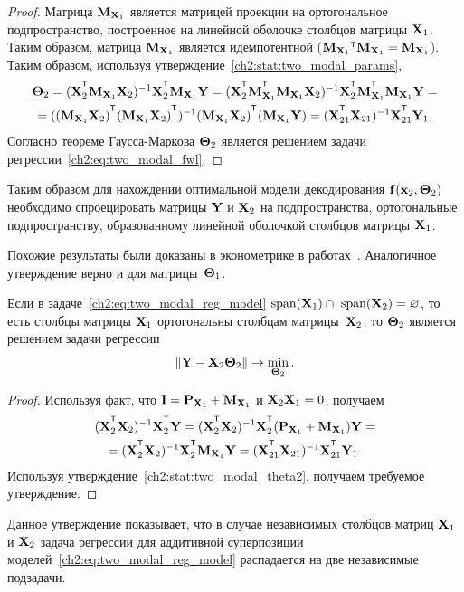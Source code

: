 \begin{proof}
	Матрица $\mathbf{M}_{\mathbf{X}_1}$ является матрицей проекции на ортогональное подпространство, построенное на линейной оболочке столбцов матрицы $\mathbf{X}_1$. Таким образом, матрица $\mathbf{M}_{\mathbf{X}_1}$ является идемпотентной ($\bM_{\bX_1}{\T} \bM_{\bX_1} = \bM_{\bX_1}$). 
	Таким образом, используя утверждение~\ref{ch2:stat:two_modal_params},
	\begin{multline*}
		\bTheta_2 = (\bX_2^{\T} \bM_{\bX_1} \bX_2)^{-1} \bX_2^{\T} \bM_{\bX_1} \bY = (\bX_2^{\T} \bM_{\bX_1}^{\T} \bM_{\bX_1} \bX_2)^{-1} \bX_2^{\T} \bM_{\bX_1}^{\T} \bM_{\bX_1} \bY = \\
		= ((\bM_{\bX_1} \bX_2)^{\T} (\bM_{\bX_1} \bX_2)^{\T})^{-1} (\bM_{\bX_1} \bX_2)^{\T} (\bM_{\bX_1} \bY) = (\bX_{21}^{\T} \bX_{21})^{-1} \bX_{21}^{\T} \bY_1.
	\end{multline*}
	Согласно теореме Гаусса-Маркова $\boldsymbol{\Theta}_2$ является решением задачи регрессии~\eqref{ch2:eq:two_modal_fwl}.
\end{proof}

Таким образом для нахождении оптимальной модели декодирования $\mathbf{f}(\mathbf{x}_2, \boldsymbol{\Theta}_2)$ необходимо спроецировать матрицы $\mathbf{Y}$ и $\mathbf{X}_2$ на подпространства, ортогональные подпространству, образованному линейной оболочкой столбцов матрицы $\mathbf{X}_1$.

Похожие результаты были доказаны в эконометрике в работах~\cite{frisch1933partial,lovell1963seasonal,cinelli2020making}. Аналогичное утверждение верно и для матрицы~$\boldsymbol{\Theta}_1$. 

\begin{statement}
	Если в задаче~\eqref{ch2:eq:two_modal_reg_model} $\text{span}(\mathbf{X}_1) \cap \text{ span}(\mathbf{X}_2) = \varnothing$, то есть столбцы матрицы $\mathbf{X}_1$ ортогональны столбцам матрицы~$\mathbf{X}_2$, то $\boldsymbol{\Theta}_2$ является решением задачи регрессии
	\[
		\| \mathbf{Y} -  \mathbf{X}_{2} \boldsymbol{\Theta}_2 \| \rightarrow \min_{\boldsymbol{\Theta}_2}.
	\]
\end{statement}

\begin{proof}
	Используя факт, что $\mathbf{I} = \mathbf{P}_{\mathbf{X}_1} + \mathbf{M}_{\mathbf{X}_1}$ и $\mathbf{X}_2 \mathbf{X}_1 = 0$, получаем
	\begin{multline*}
		(\bX_2^{\T} \bX_2)^{-1} \bX_2^{\T} \bY = (\bX_2^{\T} \bX_2)^{-1} \bX_2^{\T} (\bP_{\bX_1} + \bM_{\bX_1}) \bY = \\ = (\bX_2^{\T} \bX_2)^{-1} \bX_2^{\T} \bM_{\bX_1} \bY  = (\bX_{21}^{\T} \bX_{21})^{-1} \bX_{21}^{\T} \bY_1.
	\end{multline*}
	Используя утверждение~\ref{ch2:stat:two_modal_theta2}, получаем требуемое утверждение.
\end{proof}
Данное утверждение показывает, что в случае независимых столбцов матриц $\mathbf{X}_1$ и $\mathbf{X}_2$ задача регрессии для аддитивной суперпозиции моделей~\eqref{ch2:eq:two_modal_reg_model} распадается на две независимые подзадачи.

